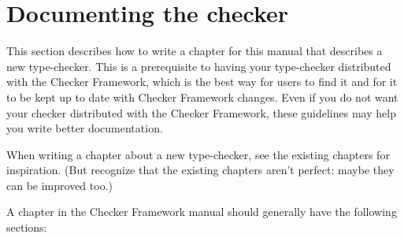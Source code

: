 %
%


\section{Documenting the checker\label{documenting-a-checker}}

This section describes how to write a chapter for this manual that
describes a new type-checker.  This is a prerequisite to having your
type-checker distributed with the Checker Framework, which is the best way
for users to find it and for it to be kept up to date with Checker
Framework changes.  Even if you do not want your checker distributed with
the Checker Framework, these guidelines may help you write better
documentation.

When writing a chapter about a new type-checker, see the existing chapters
for inspiration.  (But recognize that the existing chapters aren't perfect:
maybe they can be improved too.)

A chapter in the Checker Framework manual should generally have the
following sections:

